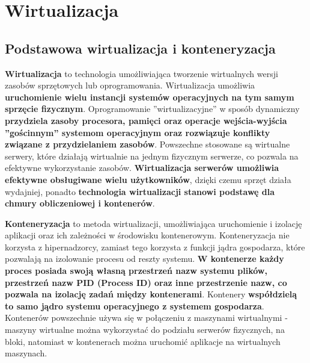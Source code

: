 \documentclass{article}
\begin{document}
\section{Wirtualizacja}

\subsection{Podstawowa wirtualizacja i konteneryzacja}
\textbf{Wirtualizacja} to technologia umożliwiająca tworzenie wirtualnych wersji zasobów sprzętowych lub oprogramowania. Wirtualizacja umożliwia \textbf{uruchomienie wielu instancji systemów operacyjnych na tym samym sprzęcie fizycznym}. Oprogramowanie ”wirtualizacyjne” w sposób dynamiczny \textbf{przydziela zasoby procesora, pamięci oraz operacje wejścia-wyjścia ”gościnnym” systemom operacyjnym oraz rozwiązuje konflikty związane z przydzielaniem zasobów}. Powszechne stosowane są wirtualne serwery, które działają wirtualnie na jednym fizycznym serwerze, co pozwala na efektywne wykorzystanie zasobów. \textbf{Wirtualizacja serwerów umożliwia efektywne obsługiwane wielu użytkowników}, dzięki czemu sprzęt działa wydajniej, ponadto \textbf{technologia wirtualizacji stanowi podstawę dla chmury obliczeniowej i kontenerów}.

\textbf{Konteneryzacja} to metoda wirtualizacji, umożliwiająca uruchomienie i izolację aplikacji oraz ich zależności w środowisku kontenerowym. Konteneryzacja nie korzysta z hipernadzorcy, zamiast tego korzysta z funkcji jądra gospodarza, które pozwalają na izolowanie procesu od reszty systemu. \textbf{W kontenerze każdy proces posiada swoją własną przestrzeń nazw systemu plików, przestrzeń nazw PID (Process ID) oraz inne przestrzenie nazw, co pozwala na izolację zadań między kontenerami}. Kontenery \textbf{współdzielą to samo jądro systemu operacyjnego z systemem gospodarza}. Kontenerów powszechnie używa się w połączeniu z maszynami wirtualnymi - maszyny wirtualne można wykorzystać do podziału serwerów fizycznych, na bloki, natomiast w kontenerach można uruchomić aplikacje na wirtualnych maszynach.
\end{document}
